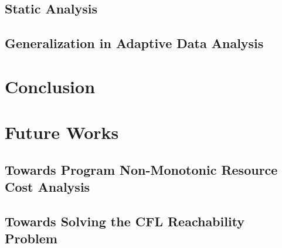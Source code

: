 \documentclass[12pt, letterpaper]{report}   %
\begin{document}
\section{Static Analysis}
\label{sec:relatedwork-static}


\section{Generalization in Adaptive Data Analysis}
\label{sec:relatedwork-adapt}


\chapter*{}



\chapter{Conclusion}
\label{sec:conclusion}

\clearpage
%
\chapter{Future Works}
\label{sec:future}
\section{Towards Program Non-Monotonic Resource Cost Analysis}
\label{sec:future-cost}


\section{Towards Solving the CFL Reachability Problem}
\label{sec:future-cfl}



\cleardoublepage


\nocite{tikzDevice,plotly,reshape,Rcomputing,Florida2000}
\end{document}
